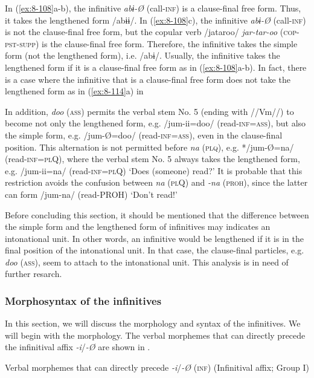 In (\ref{ex:8-108}a-b), the infinitive \textit{abɨ-Ø} (call-\textsc{inf}) is a clause-final free form. Thus, it takes the lengthened form /abɨɨ/. In (\ref{ex:8-108}c), the infinitive \textit{abɨ-Ø} (call-\textsc{inf}) is not the clause-final free form, but the copular verb /jataroo/ \textit{jar-tar-oo} (\textsc{cop}-\textsc{pst}-\textsc{supp}) is the clause-final free form. Therefore, the infinitive takes the simple form (not the lengthened form), i.e. /abɨ/. Usually, the infinitive takes the lengthened form if it is a clause-final free form as in (\ref{ex:8-108}a-b). In fact, there is a case where the infinitive that is a clause-final free form does not take the lengthened form as in (\ref{ex:8-114}a) in 

  In addition, \textit{doo} (\textsc{ass}) permits the verbal stem No. 5 (ending with //Vm//) to become not only the lengthened form, e.g. /jum-ii=doo/ (read-\textsc{inf}=\textsc{ass}), but also the simple form, e.g. /jum-Ø=doo/ (read-\textsc{inf}=\textsc{ass}), even in the clause-final position. This alternation is not permitted before \textit{na} (\textsc{plq}), e.g. */jum-Ø=na/ (read-\textsc{inf}=\textsc{pl}Q), where the verbal stem No. 5 always takes the lengthened form, e.g. /jum-ii=na/ (read-\textsc{inf}=\textsc{pl}Q) ‘Does (someone) read?’ It is probable that this restriction avoids the confusion between \textit{na} (\textsc{pl}Q) and \textit{-na} (\textsc{proh}), since the latter can form /jum-na/ (read-PROH) ‘Don’t read!’

  Before concluding this section, it should be mentioned that the difference between the simple form and the lengthened form of infinitives may indicates an intonational unit. In other words, an infinitive would be lengthened if it is in the final position of the intonational unit. In that case, the clause-final particles, e.g. \textit{doo} (\textsc{ass}), seem to attach to the intonational unit. This analysis is in need of further resarch.

\subsubsection{Morphosyntax of the infinitives}

In this section, we will discuss the morphology and syntax of the infinitives. We will begin with the morphology. The verbal morphemes that can directly precede the infinitival affix \textit{-i}/\textit{-Ø} are shown in .

\ea\label{ex:8-109}
  Verbal morphemes that can directly precede \textit{-i}/\textit{-Ø} (\textsc{inf}) (Infinitival affix; Group I)

